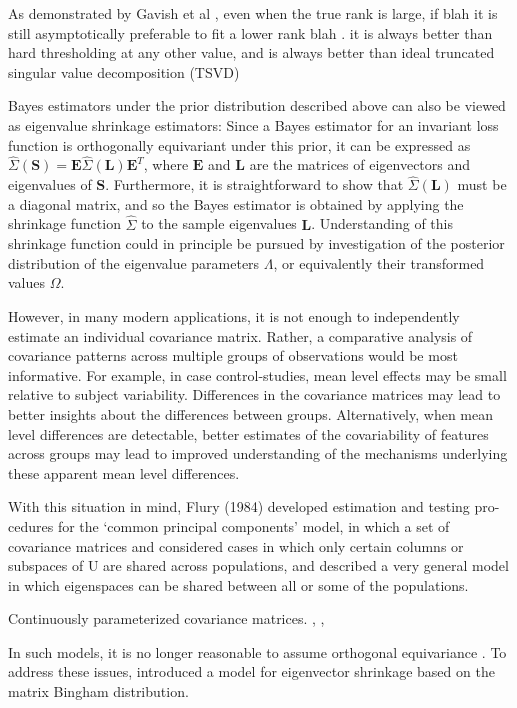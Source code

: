\documentclass{article}
\newcommand{\bl}[1]{{\mathbf #1}}
\begin{document}
As demonstrated by Gavish et al \citep{Gavish2014}, even when the
true rank is large, if blah it is still asymptotically preferable to fit a lower rank
blah .  it is always better than hard thresholding at any other value, and is always better than ideal truncated singular value decomposition (TSVD)

Bayes estimators under the prior distribution described above 
can also be viewed as eigenvalue shrinkage estimators: 
Since a Bayes estimator for an invariant loss function 
is orthogonally equivariant under this prior, 
it can be expressed as 
$\hat \Sigma(\bl S) = \bl E  \hat \Sigma (\bl L) \bl E^T$, 
where $\bl E$ and $\bl L$ are the matrices of eigenvectors and 
eigenvalues of $\bl S$. Furthermore, it is straightforward to 
show that $\hat \Sigma (\bl L)$ must be a diagonal matrix, 
and so the Bayes estimator is obtained by applying the 
shrinkage function $\hat\Sigma$ to the sample eigenvalues $\bl L$. 
Understanding of this shrinkage function could in principle 
be pursued by investigation of the posterior distribution of the 
eigenvalue parameters $\Lambda$, or equivalently their  
transformed values $\Omega$.   

However, in many modern applications, it is not enough to
independently estimate an individual covariance matrix.  Rather, a
comparative analysis of covariance patterns across multiple groups of
observations would be most informative.  For example, in case
control-studies, mean level effects may be small relative to subject
variability.  Differences in the covariance
matrices may lead to better insights about the differences between groups.
Alternatively, when mean level differences are detectable, better
estimates of the covariability of features across groups may lead to improved
understanding of the mechanisms underlying these apparent mean level
differences.

With this situation in mind, Flury (1984) developed estimation and
testing pro-cedures for the ‘common principal components’ model, in
which a set of covariance matrices
\citep{Flury1987} and \citep{Schott1991, Schott1999} considered
cases in which only certain columns or subspaces of U are shared across populations, and \citep{Boik2002} described a very general model in which eigenspaces can be shared between all or some of the populations.

Continuously parameterized covariance matrices. \citep{Hoff2011}, \citep{Chiu1996}, \citep{Yin2010}

In such models, it is no longer reasonable to assume orthogonal equivariance .
To address these issues, \citet{Hoff2009} introduced a model for
eigenvector shrinkage based on the matrix Bingham distribution.
\end{document}
